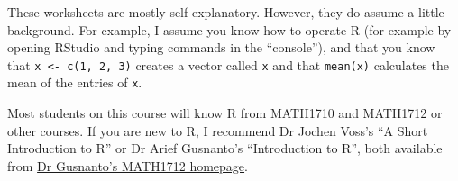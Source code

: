 \documentclass[
  a4paper,
]{article}
\theoremstyle{definition}
\theoremstyle{definition}
\theoremstyle{definition}
\theoremstyle{remark}
\begin{document}
These worksheets are mostly self-explanatory. However, they do assume a little background. For example, I assume you know how to operate R (for example by opening RStudio and typing commands in the ``console''), and that you know that \texttt{x\ \textless{}-\ c(1,\ 2,\ 3)} creates a vector called \texttt{x} and that \texttt{mean(x)} calculates the mean of the entries of \texttt{x}.

Most students on this course will know R from MATH1710 and MATH1712 or other courses. If you are new to R, I recommend Dr Jochen Voss's ``A Short Introduction to R'' or Dr Arief Gusnanto's ``Introduction to R'', both available from \href{http://www1.maths.leeds.ac.uk/~arief/MATH1712/index.html}{Dr Gusnanto's MATH1712 homepage}.
\end{document}
